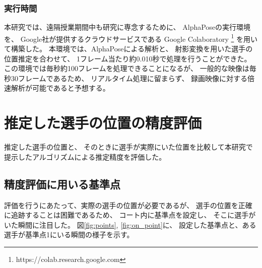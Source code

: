 \documentclass[a4j, fleqn, 12pt]{jsreport}
\begin{document}
        \subsection{実行時間}
            本研究では、遠隔授業期間中も研究に専念するために、
            AlphaPoseの実行環境を、
            Google社が提供するクラウドサービスである
            Google Colaboratory
            \footnote{https://colab.research.google.com}
            を用いて構築した。
            本環境では、AlphaPoseによる解析と、
            射影変換を用いた選手の位置推定を合わせて、
            1フレーム当たり約0.010秒で処理を行うことができた。
            この環境では毎秒約100フレームを処理できることになるが、
            一般的な映像は毎秒30フレームであるため、
            リアルタイム処理に留まらず、
            録画映像に対する倍速解析が可能であると予想する。

\chapter{推定した選手の位置の精度評価} \label{cha:evaluation}
    推定した選手の位置と、
    そのときに選手が実際にいた位置を比較して本研究で提示したアルゴリズムによる推定精度を評価した。

    \section{精度評価に用いる基準点}
        評価を行うにあたって、実際の選手の位置が必要であるが、
        選手の位置を正確に追跡することは困難であるため、
        コート内に基準点を設定し、
        そこに選手がいた瞬間に注目した。
        図\ref{fig:points}, \ref{fig:on_point}に、
        設定した基準点と、ある選手が基準点1にいる瞬間の様子を示す。
\end{document}
